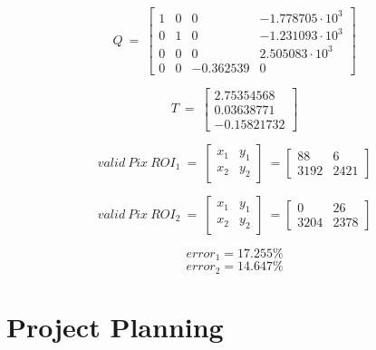 \begin{appendices}
\begin{equation}\label{eq::Q}
Q\ =\ \begin{bmatrix}
1 & 0 & 0 & -1.778705\cdot10^3\\
0 & 1 & 0 & -1.231093\cdot10^3\\
0 & 0 & 0 & 2.505083\cdot10^3\\
0 & 0 & -0.362539 & 0
\end{bmatrix}
\end{equation}

\begin{equation}\label{eq::T}
T\ =\ \begin{bmatrix}
2.75354568\\
0.03638771\\
-0.15821732
\end{bmatrix}
\end{equation}

\begin{equation}\label{eq::validpix1}
valid\ Pix\ ROI_1\ =\ 
\begin{bmatrix}
x_1 & y_1\\
x_2 & y_2
\end{bmatrix}\ =
\begin{bmatrix}
88 & 6\\
3192 & 2421
\end{bmatrix}
\end{equation}

\begin{equation}\label{eq::validpix2}
valid\ Pix\ ROI_2\ =\ 
\begin{bmatrix}
x_1 & y_1\\
x_2 & y_2
\end{bmatrix}\ =
\begin{bmatrix}
0 & 26\\
3204 & 2378
\end{bmatrix}
\end{equation}

\begin{equation}\label{eq::error1}
error_1 = 17.255\%
\end{equation}
\begin{equation}\label{eq::error2}
error_2 = 14.647\%
\end{equation}

\chapter{Project Planning}


\end{appendices}

